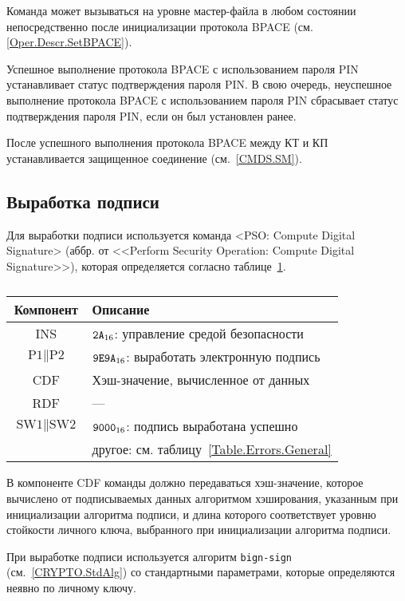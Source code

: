 Команда может вызываться на уровне мастер-файла в любом состоянии
непосредственно после инициализации протокола 
BPACE (см. \ref{Oper.Descr.SetBPACE}).

Успешное выполнение протокола BPACE с использованием пароля PIN 
устанавливает статус подтверждения пароля PIN.
В свою очередь, неуспешное выполнение протокола BPACE с использованием 
пароля PIN сбрасывает статус подтверждения пароля PIN, 
если он был установлен ранее.

После успешного выполнения протокола BPACE между КТ и КП 
устанавливается защищенное соединение (см.~\ref{CMDS.SM}).


\subsection{Выработка подписи}
\label{Oper.Descr.Signature}

Для выработки подписи используется 
команда <PSO: Compute Digital Signature>
(аббр. от <<Perform Security Operation: Compute Digital Signature>>),
которая определяется согласно 
таблице~\ref{Table.Oper.SignatureCmd}.

\begin{table}[hbt]
\caption{}\label{Table.Oper.SignatureCmd}
\begin{tabular}{|c|p{14cm}|}
\hline
Компонент & Описание\\ 
\hline
\hline
INS & $\texttt{2A}_{16}$: управление средой безопасности \\
\hline
$\text{P1} \parallel \text{P2}$ & $\texttt{9E9A}_{16}$: выработать
электронную подпись \\ 
\hline
CDF & Хэш-значение, вычисленное от данных\\
\hline 
RDF &  --- \\
\hline
$\text{SW1} \parallel \text{SW2}$ & 
  $\texttt{9000}_{16}$: подпись выработана успешно \\
  & другое: см. таблицу~\ref{Table.Errors.General} \\
\hline
\end{tabular}
\end{table}

В компоненте CDF команды должно передаваться хэш-значение, которое вычислено
от подписываемых данных алгоритмом хэширования, указанным 
при инициализации алгоритма подписи, и длина которого соответствует
уровню стойкости личного ключа, выбранного при инициализации алгоритма подписи.

При выработке подписи используется алгоритм \texttt{bign-sign}
(см.~\ref{CRYPTO.StdAlg}) со стандартными параметрами, 
которые определяются неявно по личному ключу.  

